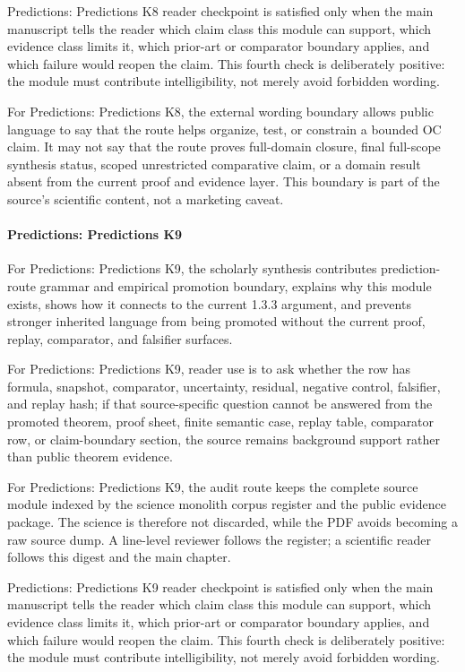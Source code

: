 Predictions: Predictions K8 reader checkpoint is satisfied only when the main manuscript tells the reader which claim class this module can support, which evidence class limits it, which prior-art or comparator boundary applies, and which failure would reopen the claim. This fourth check is deliberately positive: the module must contribute intelligibility, not merely avoid forbidden wording.


For Predictions: Predictions K8, the external wording boundary allows public language to say that the route helps organize, test, or constrain a bounded OC claim. It may not say that the route proves full-domain closure, final full-scope synthesis status, scoped unrestricted comparative claim, or a domain result absent from the current proof and evidence layer. This boundary is part of the source's scientific content, not a marketing caveat.


\paragraph{Predictions: Predictions K9}

For Predictions: Predictions K9, the scholarly synthesis contributes prediction-route grammar and empirical promotion boundary, explains why this module exists, shows how it connects to the current 1.3.3 argument, and prevents stronger inherited language from being promoted without the current proof, replay, comparator, and falsifier surfaces.


For Predictions: Predictions K9, reader use is to ask whether the row has formula, snapshot, comparator, uncertainty, residual, negative control, falsifier, and replay hash; if that source-specific question cannot be answered from the promoted theorem, proof sheet, finite semantic case, replay table, comparator row, or claim-boundary section, the source remains background support rather than public theorem evidence.


For Predictions: Predictions K9, the audit route keeps the complete source module indexed by the science monolith corpus register and the public evidence package. The science is therefore not discarded, while the PDF avoids becoming a raw source dump. A line-level reviewer follows the register; a scientific reader follows this digest and the main chapter.


Predictions: Predictions K9 reader checkpoint is satisfied only when the main manuscript tells the reader which claim class this module can support, which evidence class limits it, which prior-art or comparator boundary applies, and which failure would reopen the claim. This fourth check is deliberately positive: the module must contribute intelligibility, not merely avoid forbidden wording.


